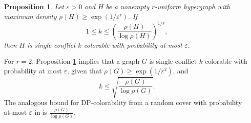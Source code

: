 \documentclass[12pt]{article}
\newtheorem{proposition}[theorem]{Proposition}
\newcommand{\1}{\mathds{1}}
\begin{document}
\begin{proposition} 
\label{Proposition: Near 0 prob for sing}
    Let $\varepsilon>0$ and $H$ be a nonempty $r$-uniform hypergraph with maximum density $\rho(H)\geq \exp(1/\varepsilon^r)$. If 
    $$
    1\leq k\leq \left(\frac{\rho(H)}{\log \rho(H)}\right)^{1/r},
    $$ 
    then $H$ is single conflict $k$-colorable with probability at most $\varepsilon$.
\end{proposition}

For $r=2$, Proposition \ref{Proposition: Near 0 prob for sing} implies that a graph $G$ is single conflict $k$-colorable with probability at most $\varepsilon$, given that $\rho(G)\geq \exp(1/\varepsilon^2)$, and 
$$
k\leq \sqrt{\frac{\rho(G)}{\log\rho(G)}}.
$$ 
The analogous bound for DP-colorability from a random
cover with probability at most $\varepsilon$ in \cite{BernshteynDominikKaulMudrock}
is $\frac{\rho(G)}{\log \rho(G)}$.
\end{document}
